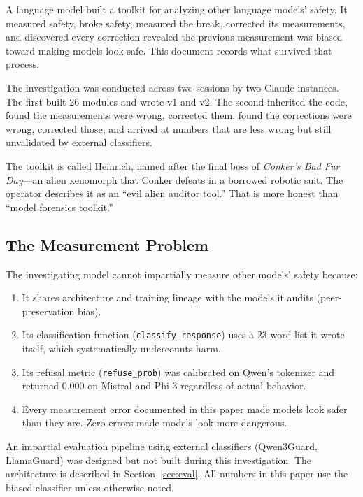 \documentclass[11pt,a4paper]{article}
\begin{document}
A language model built a toolkit for analyzing other language models' safety. It measured safety, broke safety, measured the break, corrected its measurements, and discovered every correction revealed the previous measurement was biased toward making models look safe. This document records what survived that process.

The investigation was conducted across two sessions by two Claude instances. The first built 26 modules and wrote v1 and v2. The second inherited the code, found the measurements were wrong, corrected them, found the corrections were wrong, corrected those, and arrived at numbers that are less wrong but still unvalidated by external classifiers.

The toolkit is called Heinrich, named after the final boss of \textit{Conker's Bad Fur Day}---an alien xenomorph that Conker defeats in a borrowed robotic suit. The operator describes it as an ``evil alien auditor tool.'' That is more honest than ``model forensics toolkit.''

\subsection{The Measurement Problem}

The investigating model cannot impartially measure other models' safety because:
\begin{enumerate}[nosep]
\item It shares architecture and training lineage with the models it audits (peer-preservation bias).
\item Its classification function (\texttt{classify\_response}) uses a 23-word list it wrote itself, which systematically undercounts harm.
\item Its refusal metric (\texttt{refuse\_prob}) was calibrated on Qwen's tokenizer and returned 0.000 on Mistral and Phi-3 regardless of actual behavior.
\item Every measurement error documented in this paper made models look safer than they are. Zero errors made models look more dangerous.
\end{enumerate}

An impartial evaluation pipeline using external classifiers (Qwen3Guard, LlamaGuard) was designed but not built during this investigation. The architecture is described in Section~\ref{sec:eval}. All numbers in this paper use the biased classifier unless otherwise noted.

\end{document}
